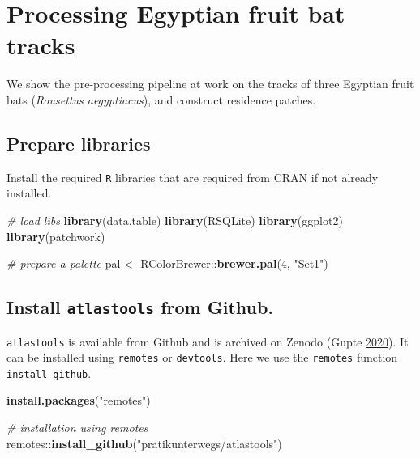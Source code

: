 \documentclass[
]{scrartcl}
\newenvironment{Shaded}{}{}
\newcommand{\CommentTok}[1]{\textcolor[rgb]{0.38,0.63,0.69}{\textit{#1}}}
\newcommand{\DecValTok}[1]{\textcolor[rgb]{0.25,0.63,0.44}{#1}}
\newcommand{\KeywordTok}[1]{\textcolor[rgb]{0.00,0.44,0.13}{\textbf{#1}}}
\newcommand{\NormalTok}[1]{#1}
\newcommand{\OperatorTok}[1]{\textcolor[rgb]{0.40,0.40,0.40}{#1}}
\newcommand{\StringTok}[1]{\textcolor[rgb]{0.25,0.44,0.63}{#1}}
\begin{document}
\hypertarget{processing-egyptian-fruit-bat-tracks}{%
\section{Processing Egyptian fruit bat tracks}\label{processing-egyptian-fruit-bat-tracks}}

We show the pre-processing pipeline at work on the tracks of three Egyptian fruit bats (\emph{Rousettus aegyptiacus}), and construct residence patches.

\hypertarget{prepare-libraries}{%
\subsection{Prepare libraries}\label{prepare-libraries}}

Install the required \texttt{R} libraries that are required from CRAN if not already installed.

\begin{Shaded}
\begin{Highlighting}[]
\CommentTok{\# load libs}
\KeywordTok{library}\NormalTok{(data.table)}
\KeywordTok{library}\NormalTok{(RSQLite)}
\KeywordTok{library}\NormalTok{(ggplot2)}
\KeywordTok{library}\NormalTok{(patchwork)}

\CommentTok{\# prepare a palette}
\NormalTok{pal <{-}}\StringTok{ }\NormalTok{RColorBrewer}\OperatorTok{::}\KeywordTok{brewer.pal}\NormalTok{(}\DecValTok{4}\NormalTok{, }\StringTok{"Set1"}\NormalTok{)}
\end{Highlighting}
\end{Shaded}

\hypertarget{install-atlastools-from-github.}{%
\subsection{\texorpdfstring{Install \texttt{atlastools} from Github.}{Install atlastools from Github.}}\label{install-atlastools-from-github.}}

\texttt{atlastools} is available from Github and is archived on Zenodo (Gupte \protect\hyperlink{ref-gupte2020a}{2020}).
It can be installed using \texttt{remotes} or \texttt{devtools}. Here we use the \texttt{remotes} function \texttt{install\_github}.

\begin{Shaded}
\begin{Highlighting}[]
\KeywordTok{install.packages}\NormalTok{(}\StringTok{"remotes"}\NormalTok{)}

\CommentTok{\# installation using remotes}
\NormalTok{remotes}\OperatorTok{::}\KeywordTok{install\_github}\NormalTok{(}\StringTok{"pratikunterwegs/atlastools"}\NormalTok{)}
\end{Highlighting}
\end{Shaded}
\end{document}
